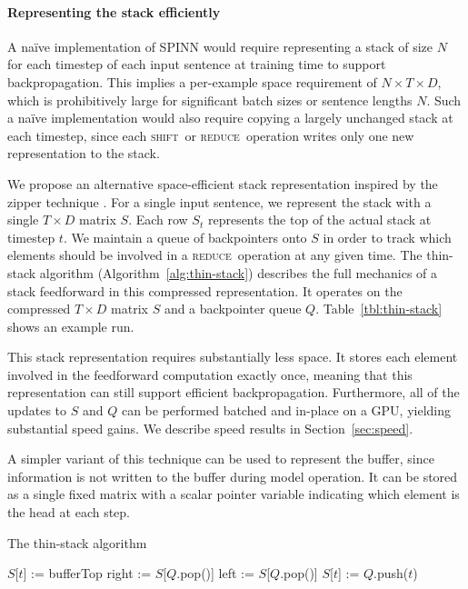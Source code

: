 \documentclass[11pt]{article}
\newcommand{\shift}{\textsc{shift}}
\newcommand{\reduce}{\textsc{reduce}}
\begin{document}
\paragraph{Representing the stack efficiently}

A na\"ive implementation of SPINN would require representing a stack of size $N$ for each timestep of each input sentence at training time to support backpropagation. This implies a per-example space requirement of $N \times T \times D$, which is prohibitively large for significant batch sizes or sentence lengths $N$. Such a na\"ive implementation would also require copying a largely unchanged stack at each timestep, since each \shift\ or \reduce\ operation writes only one new representation to the stack.

We propose an alternative space-efficient stack representation inspired by the zipper technique \citep{huet1997zipper}. For a single input sentence, we represent the stack with a single $T \times D$ matrix $S$. Each row $S_t$ represents the top of the actual stack at timestep $t$. We maintain a queue of backpointers onto $S$ in order to track which elements should be involved in a \reduce\ operation at any given time. The thin-stack algorithm (Algorithm~\ref{alg:thin-stack}) describes the full mechanics of a stack feedforward in this compressed representation. It operates on the compressed $T \times D$ matrix $S$ and a backpointer queue $Q$. Table~\ref{tbl:thin-stack} shows an example run.

This stack representation requires substantially less space. It stores each element involved in the feedforward computation exactly once, meaning that this representation can still support efficient backpropagation. Furthermore, all of the updates to $S$ and $Q$ can be performed batched and in-place on a GPU, yielding substantial speed gains. We describe speed results in Section~\ref{sec:speed}.

A simpler variant of this technique can be used to represent the buffer, since information is not written to the buffer during model operation. It can be stored as a single fixed matrix with a scalar pointer variable indicating which element is the head at each step.

\begin{algorithm}[t]
\caption{The thin-stack algorithm}
\label{alg:thin-stack}
\begin{algorithmic}[1]
    \If{op = \shift}
      \State $S$[$t$] := bufferTop
    \ElsIf{op = \reduce}
      \State right := $S$[$Q$.pop()]
      \State left := $S$[$Q$.pop()]
      \State $S$[$t$] := 
    \EndIf
    \State $Q$.push($t$)
  \EndFunction
\end{algorithmic}
\end{algorithm}
\end{document}
